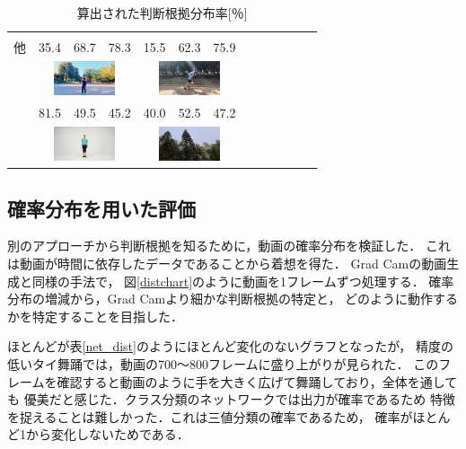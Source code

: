 \begin{table}[t]
\begin{center}
\begin{tabular}{|c|p{5mm}p{5mm}p{5mm}|p{5mm}p{5mm}p{5mm}|p{5mm}p{5mm}p{5mm}|p{5mm}p{5mm}p{5mm}|}
        & \multicolumn{3}{|c|}{}
      \\ \cline{2-13}
      他
        &35.4 &68.7 &78.3 &15.5 &62.3 &75.9 & & & & & & \\
        & \multicolumn{3}{|c|}{\includegraphics[width=18mm]{images/snaps/shadowboxing.png}}
        & \multicolumn{3}{|c|}{\includegraphics[width=18mm]{images/snaps/running.png}}
        & \multicolumn{3}{|c|}{}
        & \multicolumn{3}{|c|}{}
      \\ \cline{2-13}
        &81.5 &49.5 &45.2 &40.0 &52.5 &47.2 & & & & & & \\
        & \multicolumn{3}{|c|}{\includegraphics[width=18mm]{images/snaps/shinkokyu.png}}
        & \multicolumn{3}{|c|}{\includegraphics[width=18mm]{images/snaps/leaves.png}}
        & \multicolumn{3}{|c|}{}
        & \multicolumn{3}{|c|}{}
      \\ \hline
    \end{tabular}
  \end{center}
  \caption{算出された判断根拠分布率[％]}
  \label{devide_summary}
\end{table}
\clearpage

\subsection{確率分布を用いた評価}
別のアプローチから判断根拠を知るために，動画の確率分布を検証した．
これは動画が時間に依存したデータであることから着想を得た．
Grad Camの動画生成と同様の手法で，
図\ref{distchart}のように動画を1フレームずつ処理する．
確率分布の増減から，Grad Camより細かな判断根拠の特定と，
どのように動作するかを特定することを目指した．

ほとんどが表\ref{net_dist}のようにほとんど変化のないグラフとなったが，
精度の低いタイ舞踊では，動画の700〜800フレームに盛り上がりが見られた．
このフレームを確認すると動画のように手を大きく広げて舞踊しており，全体を通しても
優美だと感じた．クラス分類のネットワークでは出力が確率であるため
特徴を捉えることは難しかった．これは三値分類の確率であるため，
確率がほとんど1から変化しないためである．


